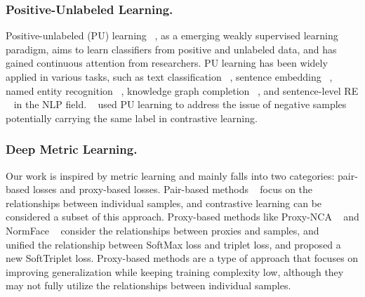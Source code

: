 \documentclass[letterpaper]{article} %
\begin{document}
\subsubsection{Positive-Unlabeled Learning.}
Positive-unlabeled (PU) learning ~\cite{DBLP:conf/kdd/ElkanN08,DBLP:conf/nips/PlessisNS14,DBLP:conf/icml/PlessisNS15,DBLP:conf/nips/KiryoNPS17,DBLP:conf/nips/GargWSBL21}, as a emerging weakly supervised learning paradigm, aims to learn classifiers from positive and unlabeled data, and has gained continuous attention from researchers. PU learning has been widely applied in various tasks, such as text classification ~\cite{DBLP:conf/ijcai/LiL03}, sentence embedding ~\cite{DBLP:conf/emnlp/CaoLERMH21}, named entity recognition ~\cite{DBLP:conf/acl/PengXZFH19, DBLP:conf/acl/ZhouLL22}, knowledge graph completion ~\cite{DBLP:conf/ijcai/TangPZZZH022}, and sentence-level RE ~\cite{DBLP:conf/aaai/HeC0ZWZ20} in the NLP field. ~\cite{DBLP:conf/nips/ChuangRL0J20} used PU learning to address the issue of negative samples potentially carrying the same label in contrastive learning.

\subsubsection{Deep Metric Learning.}
Our work is inspired by metric learning and mainly falls into two categories: pair-based losses and proxy-based losses. Pair-based methods ~\cite{DBLP:conf/cvpr/HadsellCL06,DBLP:conf/cvpr/SchroffKP15,DBLP:conf/nips/Sohn16,DBLP:conf/cvpr/WangHHDS19} focus on the relationships between individual samples, and contrastive learning can be considered a subset of this approach. Proxy-based methods like Proxy-NCA ~\cite{DBLP:conf/iccv/Movshovitz-Attias17} and NormFace ~\cite{DBLP:conf/mm/WangXCY17} consider the relationships between proxies and samples, and ~\cite{DBLP:conf/iccv/QianSSHTLJ19} unified the relationship between SoftMax loss and triplet loss, and proposed a new SoftTriplet loss. Proxy-based methods are a type of approach that focuses on improving generalization while keeping training complexity low, although they may not fully utilize the relationships between individual samples.
\end{document}
